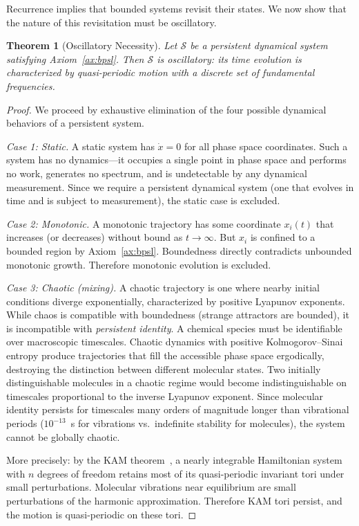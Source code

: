 \documentclass[11pt,twocolumn,a4paper]{article}
\newtheorem{theorem}{Theorem}[section]
\theoremstyle{definition}
\theoremstyle{remark}
\begin{document}
Recurrence implies that bounded systems revisit their states. We now show that the nature of this revisitation must be oscillatory.

\begin{theorem}[Oscillatory Necessity]
\label{thm:oscillatory}
Let $\mathcal{S}$ be a persistent dynamical system satisfying Axiom~\ref{ax:bpsl}. Then $\mathcal{S}$ is oscillatory: its time evolution is characterized by quasi-periodic motion with a discrete set of fundamental frequencies.
\end{theorem}

\begin{proof}
We proceed by exhaustive elimination of the four possible dynamical behaviors of a persistent system.

\emph{Case 1: Static.} A static system has $\dot{x} = 0$ for all phase space coordinates. Such a system has no dynamics---it occupies a single point in phase space and performs no work, generates no spectrum, and is undetectable by any dynamical measurement. Since we require a persistent dynamical system (one that evolves in time and is subject to measurement), the static case is excluded.

\emph{Case 2: Monotonic.} A monotonic trajectory has some coordinate $x_i(t)$ that increases (or decreases) without bound as $t \to \infty$. But $x_i$ is confined to a bounded region by Axiom~\ref{ax:bpsl}. Boundedness directly contradicts unbounded monotonic growth. Therefore monotonic evolution is excluded.

\emph{Case 3: Chaotic (mixing).} A chaotic trajectory is one where nearby initial conditions diverge exponentially, characterized by positive Lyapunov exponents. While chaos is compatible with boundedness (strange attractors are bounded), it is incompatible with \emph{persistent identity}. A chemical species must be identifiable over macroscopic timescales. Chaotic dynamics with positive Kolmogorov--Sinai entropy produce trajectories that fill the accessible phase space ergodically, destroying the distinction between different molecular states. Two initially distinguishable molecules in a chaotic regime would become indistinguishable on timescales proportional to the inverse Lyapunov exponent. Since molecular identity persists for timescales many orders of magnitude longer than vibrational periods ($10^{-13}$~s for vibrations vs.\ indefinite stability for molecules), the system cannot be globally chaotic.

More precisely: by the KAM theorem~\citep{kolmogorov1954}, a nearly integrable Hamiltonian system with $n$ degrees of freedom retains most of its quasi-periodic invariant tori under small perturbations. Molecular vibrations near equilibrium are small perturbations of the harmonic approximation. Therefore KAM tori persist, and the motion is quasi-periodic on these tori.


\end{proof}
\end{document}
